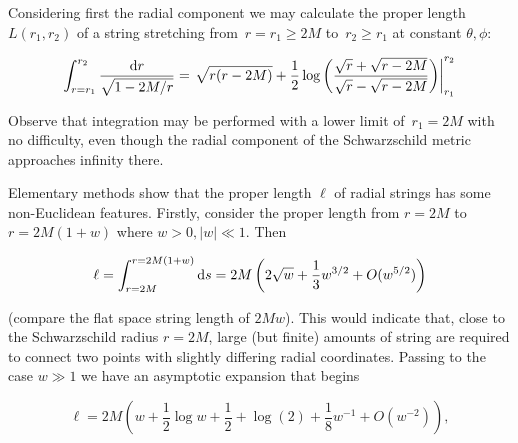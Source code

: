 \documentclass[review]{elsarticle}
\begin{document}
Considering first the radial component we may calculate the
proper length $L\left(r_1,r_2\right)$ of a string stretching
from~$r=r_1\geqslant 2M$ to~$r_2\geqslant r_1$ at constant $\theta,\phi$:



\begin{equation}\label{radial_string_length}
  \int_{r=r_1}^{r_2}\frac{\mathrm{d} r}{\sqrt{1-2M/r}}=
  \left.
  \sqrt{r(r-2M)} +\frac{1}{2}\log\left(
  \frac{\sqrt{r}+\sqrt{r-2M}}{\sqrt{r}-\sqrt{r-2M}}\right)
  \right|_{r_1}^{r_2}
  \end{equation}

Observe that integration may be performed with a lower limit
of~$r_1=2M$ with no difficulty, even though the radial component of the
Schwarzschild metric approaches infinity there.

Elementary methods show that the proper length $\ell$ of radial
strings has some non-Euclidean features.  Firstly, consider the proper
length from $r=2M$ to $r=2M(1+w)$ where $w>0, \left|w\right|\ll 1$.
Then


 \begin{equation}\label{ell}
   \ell =
   \int_{r=2M}^{r=2M(1+w)}\mathrm{d} s
   =2M\left(2\sqrt{w} + \frac{1}{3}w^{3/2} + O(w^{5/2})\right)
 \end{equation}

(compare the flat space string length of $2Mw$).  This would indicate
 that, close to the Schwarzschild radius $r=2M$, large (but finite)
 amounts of string are required to connect two points with slightly
 differing radial coordinates.  Passing to the case $w\gg 1$ we have
 an asymptotic expansion that begins

% 
\begin{equation}\label{asymptotic_ell}
  \ell = 2M\left(w +  \frac{1}{2}\log w + \frac{1}{2} + \log(2)  +  \frac{1}{8}w^{-1} + O(w^{-2})\right),
\end{equation}
\end{document}
